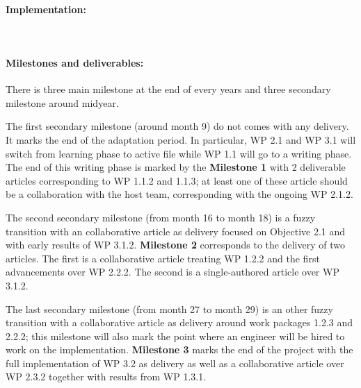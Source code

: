 \documentclass{article}[11pt]
\begin{document}
\paragraph{Implementation:}~\\


\paragraph{Milestones and deliverables:}

There is three main milestone at the end of every years and three secondary milestone around midyear.

The first secondary milestone (around month 9) do not comes with any delivery. It marks the end of the adaptation period. In particular, WP 2.1 and WP 3.1 will switch from learning phase to active file while WP 1.1 will go to a writing phase. The end of this writing phase is marked by the {\bf Milestone 1} with 2 deliverable articles corresponding to WP 1.1.2 and 1.1.3; at least one of these article should be a collaboration with the host team, corresponding with the ongoing WP 2.1.2.

The second secondary milestone (from month 16 to month 18) is a fuzzy transition with an collaborative article as delivery focused on Objective 2.1 and with early results of WP 3.1.2. {\bf Milestone 2} corresponds to the delivery of two articles. The first is a collaborative article treating WP 1.2.2 and the first advancements over WP 2.2.2. The second is a single-authored article over WP 3.1.2.

The last secondary milestone (from month 27 to month 29) is an other fuzzy transition with a collaborative article as delivery around work packages 1.2.3 and 2.2.2; this milestone will also mark the point where an engineer will be hired to work on the implementation.  {\bf Milestone 3} marks the end of the project with the full implementation of WP 3.2 as delivery as well as a collaborative article over WP 2.3.2 together with results from WP 1.3.1.
\end{document}
